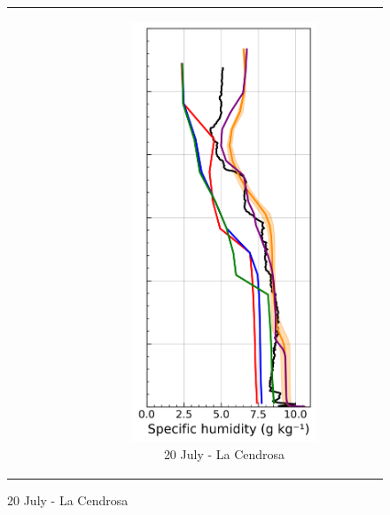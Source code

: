 \begin{figure}[hbtp]
{\begin{tabular}{@{}cccc@{}}
\begin{subfigure}[t]{0.382\textwidth}
        \end{subfigure} &
        \begin{subfigure}[t]{0.289\textwidth}
            \caption{20 July - La Cendrosa}
            \includegraphics[width=\textwidth]{images/chap6/profiles/profile_cendrosa_ovap_2007_.png}

\end{subfigure}
\end{tabular}}
\end{figure}
